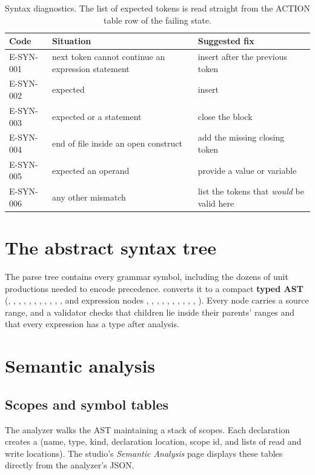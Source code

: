 \begin{table}[H]\centering\small
\begin{tabular}{@{}lll@{}}\toprule
\textbf{Code} & \textbf{Situation} & \textbf{Suggested fix}\\ \midrule
E-SYN-001 & next token cannot continue an expression statement & insert \code{;} after the previous token\\
E-SYN-002 & expected \code{)} & insert \code{)}\\
E-SYN-003 & expected \code{\}} or a statement & close the block\\
E-SYN-004 & end of file inside an open construct & add the missing closing token\\
E-SYN-005 & expected an operand & provide a value or variable\\
E-SYN-006 & any other mismatch & list the tokens that \emph{would} be valid here\\ \bottomrule
\end{tabular}
\caption{Syntax diagnostics. The list of expected tokens is read straight from the ACTION table row of the failing state.}
\end{table}

\section{The abstract syntax tree}
The parse tree contains every grammar symbol, including the dozens of unit productions needed to encode precedence.  converts it to a compact \textbf{typed AST} (, , , , , , , , , , , and expression nodes , , , , , , , , , , ). Every node carries a source range, and a validator checks that children lie inside their parents' ranges and that every expression has a type after analysis.

\section{Semantic analysis}
\subsection{Scopes and symbol tables}
The analyzer walks the AST maintaining a stack of scopes. Each declaration creates a  (name, type, kind, declaration location, scope id, and lists of read and write locations). The studio's \emph{Semantic Analysis} page displays these tables directly from the analyzer's JSON.

